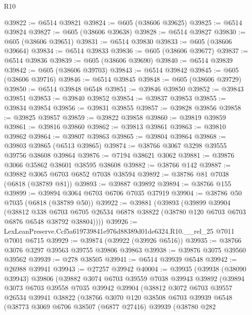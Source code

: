 \begin{lexlean}{R10}
\begin{coremodule}
@39822 := @6514 @39821
@39824 := @605 (@38606 @39625)
@39825 := @6514 @39824
@39827 := @605 (@38606 @39638)
@39828 := @6514 @39827
@39830 := @605 (@38606 @39651)
@39831 := @6514 @39830
@39833 := @605 (@38606 @39664)
@39834 := @6514 @39833
@39836 := @605 (@38606 @39677)
@39837 := @6514 @39836
@39839 := @605 (@38606 @39690)
@39840 := @6514 @39839
@39842 := @605 (@38606 @39703)
@39843 := @6514 @39842
@39845 := @605 (@38606 @39716)
@39846 := @6514 @39845
@39848 := @605 (@38606 @39729)
@39850 := @6514 @39848 @6548
@39851 := @39846 @39850
@39852 := @39843 @39851
@39853 := @39840 @39852
@39854 := @39837 @39853
@39855 := @39834 @39854
@39856 := @39831 @39855
@39857 := @39828 @39856
@39858 := @39825 @39857
@39859 := @39822 @39858
@39860 := @39819 @39859
@39861 := @39816 @39860
@39862 := @39813 @39861
@39863 := @39810 @39862
@39864 := @39807 @39863
@39865 := @39804 @39864
@39868 := @39803 @39865 (@6513 @39865)
@39874 := @38766 @3067 @3298 @39555 @39756 @38608 @39864
@39876 := @7194 @38621 @3062
@39881 := @39876 @3066 @35862 @38601 @38595 @38608
@39882 := @38766 @142
@39887 := @39882 @3065 @6703 @6852 @7038 @38594
@39892 := @38786 @81 @7038 (@6818 (@38789 @81))
@39893 := @39887 @39892
@39894 := @38766 @155
@39899 := @39894 @3064 @6703 @6706 @7035 @37919
@39904 := @38786 @50 @7035 (@6818 (@38789 @50))
@39922 := @39881
    (@39893
      (@39899
        @39904
        (@38812
          @338
          @6703
          @6705
          @26534
          @6878
          @38822
          (@38780 @120 @6703 @6703 @6876 @6548 @38792 @38804))))
@39926 := LexLeanPreserve.Ccf5a619739841e976d88389d01de6324.R10.__rel_25 @7011 @7001 @6715
@39929 := @39874 (@39922 (@39926 @6516))
@39935 := @38766 @3076 @3297 @39563 @39755 @39806 @39863
@39938 := @39876 @3075 @39560 @39562
@39939 := @278 @38505
@39941 := @6514 @39939 @6548
@39942 := @26988 @39941
@39943 := @27257 @39942
@40004 := @39935
    (@39938
      (@38090 @39943)
      @39806
      (@39882
        @3074
        @6703
        @39559
        @7038
        @39943
        @39892
        (@39894
          @3073
          @6703
          @39558
          @7035
          @39942
          @39904
          (@38812
            @3072
            @6703
            @39557
            @26534
            @39941
            @38822
            (@38766
              @3070
              @120
              @38508
              @6703
              @39939
              @6548
              (@38773
                @3069
                @6706
                @38507
                (@6877 @27416)
                @39939
                (@38780
                  @282

\end{coremodule}
\end{lexlean}
